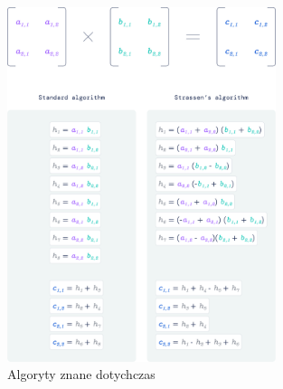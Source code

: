 \documentclass{article}
\begin{document}
\begin{figure}[H]
  \centering
    \includegraphics[width=0.7\textwidth]{images/standard_algorithms.png}
  \caption{Algoryty znane dotychczas}
\end{figure}
\end{document}
